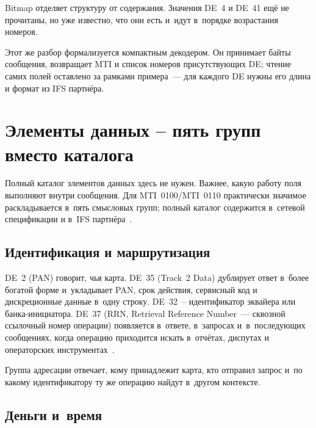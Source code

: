 Bitmap отделяет структуру от содержания. Значения DE~4 и DE~41 ещё не прочитаны, но уже известно, что они есть и~идут в~порядке возрастания номеров.

Этот же разбор формализуется компактным декодером. Он принимает байты
сообщения, возвращает MTI и список номеров присутствующих DE; чтение
самих полей оставлено за рамками примера~--- для каждого DE нужны
его длина и формат из IFS партнёра.


\section{Элементы данных -- пять групп вместо каталога}\label{sec:iso8583-data-elements}

Полный каталог элементов данных здесь не нужен. Важнее, какую работу поля выполняют внутри сообщения.
Для MTI~0100/MTI~0110 практически значимое раскладывается в~пять смысловых групп; полный каталог содержится в~сетевой спецификации и в~IFS партнёра~\cite{fis-iso8583-guide-2023}.

\subsection*{Идентификация и маршрутизация}

DE~2 (PAN) говорит, чья карта. DE~35 (Track~2 Data) дублирует ответ в~более богатой форме и~укладывает PAN, срок действия, сервисный код и дискреционные данные в~одну строку.
DE~32~-- идентификатор эквайера или банка-инициатора. DE~37 (RRN, Retrieval Reference Number~--- сквозной ссылочный номер операции) появляется в~ответе, в~запросах и~в~последующих сообщениях, когда операцию приходится искать в~отчётах, диспутах и операторских инструментах~\cite{fis-iso8583-guide-2023}.

Группа адресации отвечает, кому принадлежит карта, кто отправил запрос и~по какому идентификатору ту же операцию найдут в~другом контексте.

\subsection*{Деньги и~время}

